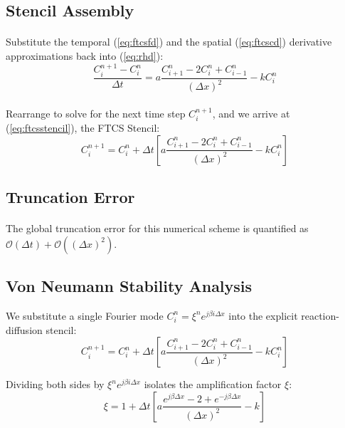 \subsection*{Stencil Assembly}
\paragraph{}
Substitute the temporal (\ref{eq:ftcsfd}) and the spatial (\ref{eq:ftcscd}) derivative approximations back into (\ref{eq:rhd}):
\begin{equation*}
\frac{C_i^{n+1} - C_i^n}{\Delta t} = a \frac{C_{i+1}^n - 2C_i^n + C_{i-1}^n}{(\Delta x)^2} - kC_i^n
\end{equation*}
\paragraph{}
Rearrange to solve for the next time step $C_i^{n+1}$, and we arrive at (\ref{eq:ftcsstencil}), the FTCS Stencil:
\begin{equation*}
C_i^{n+1} = C_i^n + \Delta t \left[ a \frac{C_{i+1}^n - 2C_i^n + C_{i-1}^n}{(\Delta x)^2} - kC_i^n \right]
\end{equation*}

\subsection*{Truncation Error}
\paragraph{}
The global truncation error for this numerical scheme is quantified as $\mathcal{O}(\Delta t) + \mathcal{O}((\Delta x)^2)$.

\subsection*{Von Neumann Stability Analysis}

We substitute a single Fourier mode $C_i^n = \xi^n e^{j \beta i \Delta x}$ into the explicit reaction-diffusion stencil:
\begin{equation}
C_i^{n+1} = C_i^n + \Delta t \left[ a \frac{C_{i+1}^n - 2C_i^n + C_{i-1}^n}{(\Delta x)^2} - kC_i^n \right]
\end{equation}

Dividing both sides by $\xi^n e^{j \beta i \Delta x}$ isolates the amplification factor $\xi$:
\begin{equation}
\xi = 1 + \Delta t \left[ a \frac{e^{j \beta \Delta x} - 2 + e^{-j \beta \Delta x}}{(\Delta x)^2} - k \right]
\end{equation}

